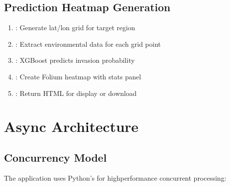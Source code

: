 \documentclass[letterpaper,10pt,english]{sphinxmanual}
\begin{document}
\subsection{Prediction Heatmap Generation}
\label{\detokenize{architecture:prediction-heatmap-generation}}\begin{enumerate}
%
\item {} 
\sphinxAtStartPar
{}: Generate lat/lon grid for target region

\item {} 
\sphinxAtStartPar
{}: Extract environmental data for each grid point

\item {} 
\sphinxAtStartPar
{}: XGBoost predicts invasion probability

\item {} 
\sphinxAtStartPar
{}: Create Folium heatmap with stats panel

\item {} 
\sphinxAtStartPar
{}: Return HTML for display or download

\end{enumerate}


\section{Async Architecture}
\label{\detokenize{architecture:async-architecture}}

\subsection{Concurrency Model}
\label{\detokenize{architecture:concurrency-model}}
\sphinxAtStartPar
The application uses Python’s  for high\sphinxhyphen{}performance concurrent processing:
\end{document}
